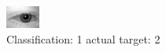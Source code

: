 \begin{figure}[h!]
\begin{center}
\includegraphics[width=0.60\columnwidth]{figures/ID463_class_1_target_2.png}
\end{center}
\caption{ Classification: 1 actual target: 2}
\label{fig:ID463_class_1_target_2}
\end{figure}
